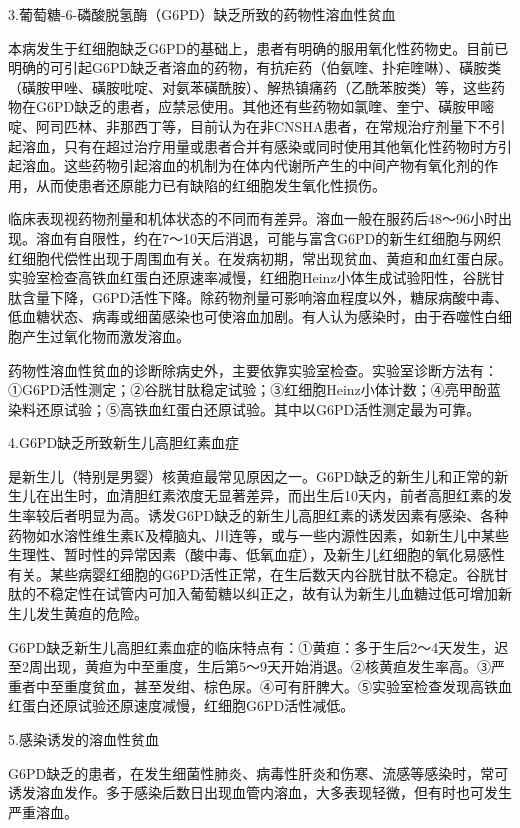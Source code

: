 3.葡萄糖-6-磷酸脱氢酶（G6PD）缺乏所致的药物性溶血性贫血%

本病发生于红细胞缺乏G6PD的基础上，患者有明确的服用氧化性药物史。目前已明确的可引起G6PD缺乏者溶血的药物，有抗疟药（伯氨喹、扑疟喹啉）、磺胺类（磺胺甲唑、磺胺吡啶、对氨苯磺酰胺）、解热镇痛药（乙酰苯胺类）等，这些药物在G6PD缺乏的患者，应禁忌使用。其他还有些药物如氯喹、奎宁、磺胺甲嘧啶、阿司匹林、非那西丁等，目前认为在非CNSHA患者，在常规治疗剂量下不引起溶血，只有在超过治疗用量或患者合并有感染或同时使用其他氧化性药物时方引起溶血。这些药物引起溶血的机制为在体内代谢所产生的中间产物有氧化剂的作用，从而使患者还原能力已有缺陷的红细胞发生氧化性损伤。

临床表现视药物剂量和机体状态的不同而有差异。溶血一般在服药后48～96小时出现。溶血有自限性，约在7～10天后消退，可能与富含G6PD的新生红细胞与网织红细胞代偿性出现于周围血有关。在发病初期，常出现贫血、黄疸和血红蛋白尿。实验室检查高铁血红蛋白还原速率减慢，红细胞Heinz小体生成试验阳性，谷胱甘肽含量下降，G6PD活性下降。除药物剂量可影响溶血程度以外，糖尿病酸中毒、低血糖状态、病毒或细菌感染也可使溶血加剧。有人认为感染时，由于吞噬性白细胞产生过氧化物而激发溶血。

药物性溶血性贫血的诊断除病史外，主要依靠实验室检查。实验室诊断方法有：①G6PD活性测定；②谷胱甘肽稳定试验；③红细胞Heinz小体计数；④亮甲酚蓝染料还原试验；⑤高铁血红蛋白还原试验。其中以G6PD活性测定最为可靠。

4.G6PD缺乏所致新生儿高胆红素血症%

是新生儿（特别是男婴）核黄疸最常见原因之一。G6PD缺乏的新生儿和正常的新生儿在出生时，血清胆红素浓度无显著差异，而出生后10天内，前者高胆红素的发生率较后者明显为高。诱发G6PD缺乏的新生儿高胆红素的诱发因素有感染、各种药物如水溶性维生素K及樟脑丸、川连等，或与一些内源性因素，如新生儿中某些生理性、暂时性的异常因素（酸中毒、低氧血症），及新生儿红细胞的氧化易感性有关。某些病婴红细胞的G6PD活性正常，在生后数天内谷胱甘肽不稳定。谷胱甘肽的不稳定性在试管内可加入葡萄糖以纠正之，故有认为新生儿血糖过低可增加新生儿发生黄疸的危险。

G6PD缺乏新生儿高胆红素血症的临床特点有：①黄疸：多于生后2～4天发生，迟至2周出现，黄疸为中至重度，生后第5～9天开始消退。②核黄疸发生率高。③严重者中至重度贫血，甚至发绀、棕色尿。④可有肝脾大。⑤实验室检查发现高铁血红蛋白还原试验还原速度减慢，红细胞G6PD活性减低。

5.感染诱发的溶血性贫血%

G6PD缺乏的患者，在发生细菌性肺炎、病毒性肝炎和伤寒、流感等感染时，常可诱发溶血发作。多于感染后数日出现血管内溶血，大多表现轻微，但有时也可发生严重溶血。

